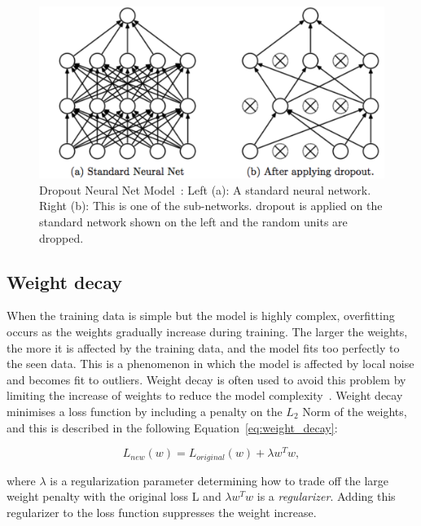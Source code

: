 \begin{figure}[ht]
    \centering
    \includegraphics[scale=0.35]{images/dropout.png}
\caption{Dropout Neural Net Model~\parencite{srivastava2014dropout}: Left (a): A standard neural network. Right (b): This is one of the sub-networks. dropout is applied on the standard network shown on the left and the random units are dropped. 
}
    \label{fig:Early_stopping}
\end{figure}

\subsection{Weight decay}

When the training data is simple but the model is highly complex, overfitting occurs as the weights gradually increase during training. The larger the weights, the more it is affected by the training data, and the model fits too perfectly to the seen data. This is a phenomenon in which the model is affected by local noise and becomes fit to outliers. Weight decay is often used to avoid this problem by limiting the increase of weights to reduce the model complexity~\parencite{krogh1992simple}. Weight decay minimises a loss function by including a penalty on the $L_2$ Norm of the weights, and this is described in the following Equation~\ref{eq:weight_decay}:

\begin{equation}
    L_{new}(w) = L_{original}(w) + \lambda w^Tw ,
    \label{eq:weight_decay}
\end{equation}


where $\lambda$ is a regularization parameter determining how to trade off the large weight penalty with the original loss L and $\lambda w^Tw$ is a \textit{regularizer}. Adding this regularizer to the loss function suppresses the weight increase. 

